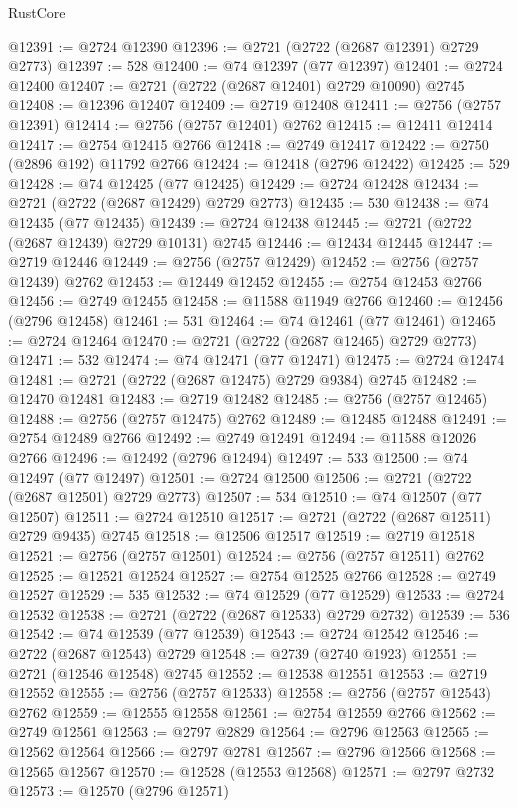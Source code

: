 \begin{lexlean}{RustCore}
\begin{coremodule}
@12391 := @2724 @12390
@12396 := @2721 (@2722 (@2687 @12391) @2729 @2773)
@12397 := 528
@12400 := @74 @12397 (@77 @12397)
@12401 := @2724 @12400
@12407 := @2721 (@2722 (@2687 @12401) @2729 @10090) @2745
@12408 := @12396 @12407
@12409 := @2719 @12408
@12411 := @2756 (@2757 @12391)
@12414 := @2756 (@2757 @12401) @2762
@12415 := @12411 @12414
@12417 := @2754 @12415 @2766
@12418 := @2749 @12417
@12422 := @2750 (@2896 @192) @11792 @2766
@12424 := @12418 (@2796 @12422)
@12425 := 529
@12428 := @74 @12425 (@77 @12425)
@12429 := @2724 @12428
@12434 := @2721 (@2722 (@2687 @12429) @2729 @2773)
@12435 := 530
@12438 := @74 @12435 (@77 @12435)
@12439 := @2724 @12438
@12445 := @2721 (@2722 (@2687 @12439) @2729 @10131) @2745
@12446 := @12434 @12445
@12447 := @2719 @12446
@12449 := @2756 (@2757 @12429)
@12452 := @2756 (@2757 @12439) @2762
@12453 := @12449 @12452
@12455 := @2754 @12453 @2766
@12456 := @2749 @12455
@12458 := @11588 @11949 @2766
@12460 := @12456 (@2796 @12458)
@12461 := 531
@12464 := @74 @12461 (@77 @12461)
@12465 := @2724 @12464
@12470 := @2721 (@2722 (@2687 @12465) @2729 @2773)
@12471 := 532
@12474 := @74 @12471 (@77 @12471)
@12475 := @2724 @12474
@12481 := @2721 (@2722 (@2687 @12475) @2729 @9384) @2745
@12482 := @12470 @12481
@12483 := @2719 @12482
@12485 := @2756 (@2757 @12465)
@12488 := @2756 (@2757 @12475) @2762
@12489 := @12485 @12488
@12491 := @2754 @12489 @2766
@12492 := @2749 @12491
@12494 := @11588 @12026 @2766
@12496 := @12492 (@2796 @12494)
@12497 := 533
@12500 := @74 @12497 (@77 @12497)
@12501 := @2724 @12500
@12506 := @2721 (@2722 (@2687 @12501) @2729 @2773)
@12507 := 534
@12510 := @74 @12507 (@77 @12507)
@12511 := @2724 @12510
@12517 := @2721 (@2722 (@2687 @12511) @2729 @9435) @2745
@12518 := @12506 @12517
@12519 := @2719 @12518
@12521 := @2756 (@2757 @12501)
@12524 := @2756 (@2757 @12511) @2762
@12525 := @12521 @12524
@12527 := @2754 @12525 @2766
@12528 := @2749 @12527
@12529 := 535
@12532 := @74 @12529 (@77 @12529)
@12533 := @2724 @12532
@12538 := @2721 (@2722 (@2687 @12533) @2729 @2732)
@12539 := 536
@12542 := @74 @12539 (@77 @12539)
@12543 := @2724 @12542
@12546 := @2722 (@2687 @12543) @2729
@12548 := @2739 (@2740 @1923)
@12551 := @2721 (@12546 @12548) @2745
@12552 := @12538 @12551
@12553 := @2719 @12552
@12555 := @2756 (@2757 @12533)
@12558 := @2756 (@2757 @12543) @2762
@12559 := @12555 @12558
@12561 := @2754 @12559 @2766
@12562 := @2749 @12561
@12563 := @2797 @2829
@12564 := @2796 @12563
@12565 := @12562 @12564
@12566 := @2797 @2781
@12567 := @2796 @12566
@12568 := @12565 @12567
@12570 := @12528 (@12553 @12568)
@12571 := @2797 @2732
@12573 := @12570 (@2796 @12571)

\end{coremodule}
\end{lexlean}
